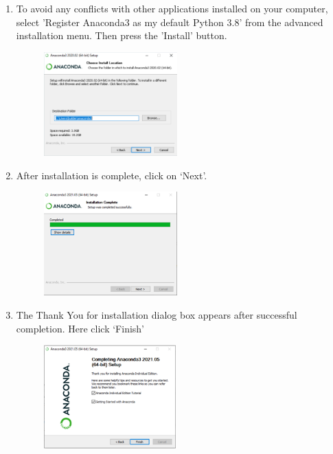 \documentclass[conference]{IEEEtran}
\begin{document}
\begin{enumerate}
\begin{figure}[!htbp]
    \label{fig:my_label}
\end{figure}
\begin{figure}[!htbp]
    \centering
    
\end{figure}
\item
To avoid any conflicts with other applications installed on your computer, select 'Register Anaconda3 as my default Python 3.8' from the advanced installation menu. Then press the 'Install' button.
\begin{figure}[!htbp]
    \centering
    \includegraphics[height=4cm]{task7.png}
   
    \label{fig:my_label}
\end{figure}
\begin{figure}[!htbp]
    \centering
    
\end{figure}

\item 
After installation is complete, click on ‘Next’.
\begin{figure}[!htbp]
    \centering
    \includegraphics[height=4cm]{Task1 Step9.png}
   
    \label{fig:my_label}
\end{figure}
\begin{figure}[!htbp]
    \centering
    
\end{figure}

\item
The Thank You for installation dialog box appears after successful completion. Here click ‘Finish’
\begin{figure}[!htbp]
    \centering
    \includegraphics[height=4cm]{Task1 Step10.png}
   

\end{figure}
\end{enumerate}
\end{document}
